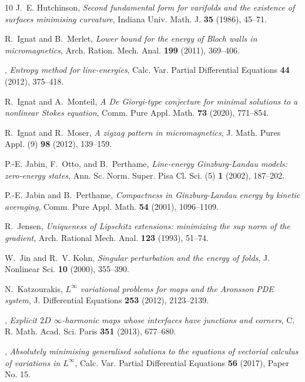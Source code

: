 \documentclass[a4paper]{article}
\theoremstyle{definition}
\theoremstyle{remark}
\begin{document}
\begin{thebibliography}{10}
J.~E. Hutchinson, \emph{Second fundamental form for varifolds and the existence
  of surfaces minimising curvature}, Indiana Univ. Math. J. \textbf{35} (1986),
  45--71.

R.~Ignat and B.~Merlet, \emph{Lower bound for the energy of {B}loch walls in
  micromagnetics}, Arch. Ration. Mech. Anal. \textbf{199} (2011), 369--406.

\bysame, \emph{Entropy method for line-energies}, Calc. Var. Partial
  Differential Equations \textbf{44} (2012), 375--418.

R.~Ignat and A.~Monteil, \emph{A {D}e {G}iorgi-type conjecture for minimal
  solutions to a nonlinear {S}tokes equation}, Comm. Pure Appl. Math.
  \textbf{73} (2020), 771--854.

R.~Ignat and R.~Moser, \emph{A zigzag pattern in micromagnetics}, J. Math.
  Pures Appl. (9) \textbf{98} (2012), 139--159.

P.-E. Jabin, F.~Otto, and B.~Perthame, \emph{Line-energy {G}inzburg-{L}andau
  models: zero-energy states}, Ann. Sc. Norm. Super. Pisa Cl. Sci. (5)
  \textbf{1} (2002), 187--202.

P.-E. Jabin and B.~Perthame, \emph{Compactness in {G}inzburg-{L}andau energy by
  kinetic averaging}, Comm. Pure Appl. Math. \textbf{54} (2001), 1096--1109.

R.~Jensen, \emph{Uniqueness of {L}ipschitz extensions: minimizing the sup norm
  of the gradient}, Arch. Rational Mech. Anal. \textbf{123} (1993), 51--74.

W.~Jin and R.~V. Kohn, \emph{Singular perturbation and the energy of folds}, J.
  Nonlinear Sci. \textbf{10} (2000), 355--390.

N.~Katzourakis, \emph{{$L^\infty$} variational problems for maps and the
  {A}ronsson {PDE} system}, J. Differential Equations \textbf{253} (2012),
  2123--2139.

\bysame, \emph{Explicit {$2D$} {$\infty$}-harmonic maps whose interfaces have
  junctions and corners}, C. R. Math. Acad. Sci. Paris \textbf{351} (2013),
  677--680.

\bysame, \emph{Absolutely minimising generalised solutions to the equations of
  vectorial calculus of variations in {$L^\infty$}}, Calc. Var. Partial
  Differential Equations \textbf{56} (2017), Paper No. 15.


\end{thebibliography}
\end{document}

